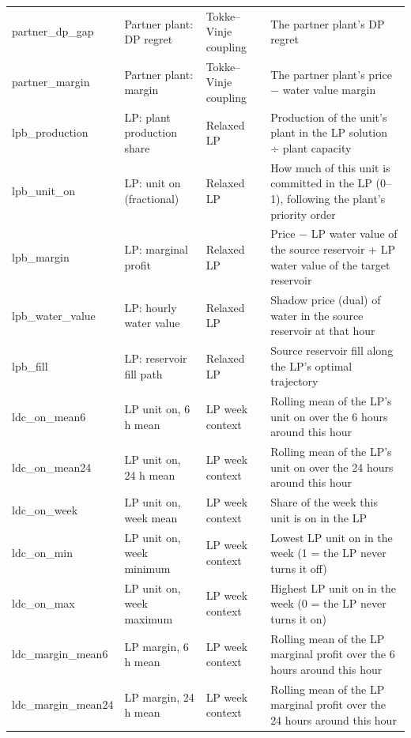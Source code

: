 \begin{longtable}{p{2.6cm}p{3.6cm}p{2.4cm}p{5.6cm}}
partner\_\allowbreak{}dp\_\allowbreak{}gap & Partner plant: DP regret & Tokke–Vinje coupling & The partner plant's DP regret \\
partner\_\allowbreak{}margin & Partner plant: margin & Tokke–Vinje coupling & The partner plant's price − water value margin \\
lpb\_\allowbreak{}production & LP: plant production share & Relaxed LP & Production of the unit's plant in the LP solution ÷ plant capacity \\
lpb\_\allowbreak{}unit\_\allowbreak{}on & LP: unit on (fractional) & Relaxed LP & How much of this unit is committed in the LP (0–1), following the plant's priority order \\
lpb\_\allowbreak{}margin & LP: marginal profit & Relaxed LP & Price − LP water value of the source reservoir + LP water value of the target reservoir \\
lpb\_\allowbreak{}water\_\allowbreak{}value & LP: hourly water value & Relaxed LP & Shadow price (dual) of water in the source reservoir at that hour \\
lpb\_\allowbreak{}fill & LP: reservoir fill path & Relaxed LP & Source reservoir fill along the LP's optimal trajectory \\
ldc\_\allowbreak{}on\_\allowbreak{}mean6 & LP unit on, 6 h mean & LP week context & Rolling mean of the LP's unit on over the 6 hours around this hour \\
ldc\_\allowbreak{}on\_\allowbreak{}mean24 & LP unit on, 24 h mean & LP week context & Rolling mean of the LP's unit on over the 24 hours around this hour \\
ldc\_\allowbreak{}on\_\allowbreak{}week & LP unit on, week mean & LP week context & Share of the week this unit is on in the LP \\
ldc\_\allowbreak{}on\_\allowbreak{}min & LP unit on, week minimum & LP week context & Lowest LP unit on in the week (1 = the LP never turns it off) \\
ldc\_\allowbreak{}on\_\allowbreak{}max & LP unit on, week maximum & LP week context & Highest LP unit on in the week (0 = the LP never turns it on) \\
ldc\_\allowbreak{}margin\_\allowbreak{}mean6 & LP margin, 6 h mean & LP week context & Rolling mean of the LP marginal profit over the 6 hours around this hour \\
ldc\_\allowbreak{}margin\_\allowbreak{}mean24 & LP margin, 24 h mean & LP week context & Rolling mean of the LP marginal profit over the 24 hours around this hour \\

\end{longtable}
